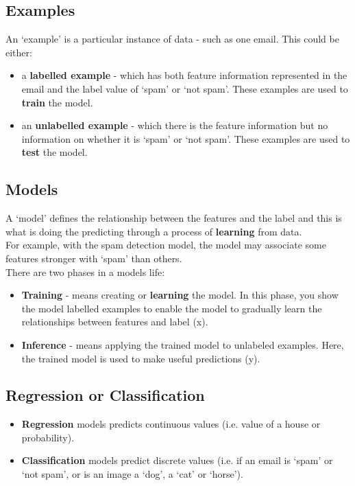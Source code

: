 \documentclass[12pt]{article}
\begin{document}
\subsection{Examples}
An `example' is a particular instance of data - such as one email. This could be either:
\begin{itemize}
	\item a \textbf{labelled example} - which has both feature information represented in the email and the label value of `spam' or `not spam'. These examples are used to \textbf{train} the model.
	\item an \textbf{unlabelled example} - which there is the feature information but no information on whether it is `spam' or `not spam'. These examples are used to \textbf{test} the model.
\end{itemize}
\subsection{Models}
A `model' defines the relationship between the features and the label and this is what is doing the predicting through a process of \textbf{learning} from data. \\\newline For example, with the spam detection model, the model may associate some features stronger with `spam' than others.
\\\newline There are two phases in a models life:
	\begin{itemize}
		\item \textbf{Training} - means creating or \textbf{learning} the model. In this phase, you show the model labelled examples to enable the model to gradually learn the relationships between features and label (x).
		\item \textbf{Inference} - means applying the trained model to unlabeled examples. Here, the trained model is used to make useful predictions (y).
	\end{itemize}
\subsection{Regression or Classification}
\begin{itemize}
	\item \textbf{Regression} models predicts continuous values (i.e. value of a house or probability).
	\item \textbf{Classification} models predict discrete values (i.e. if an email is `spam' or `not spam', or is an image a `dog', a `cat' or `horse').
\end{itemize}
\end{document}
